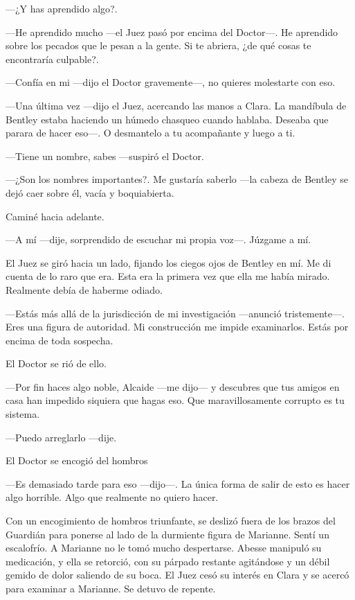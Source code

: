 ---¿Y has aprendido algo?.

---He aprendido mucho ---el Juez pasó por encima del Doctor---. He
aprendido sobre los pecados que le pesan a la gente. Si te abriera, ¿de
qué cosas te encontraría culpable?.

---Confía en mi ---dijo el Doctor gravemente---, no quieres molestarte
con eso.

---Una última vez ---dijo el Juez, acercando las manos a Clara. La
mandíbula de Bentley estaba haciendo un húmedo chasqueo cuando hablaba.
Deseaba que parara de hacer eso---. O desmantelo a tu acompañante y
luego a ti.

---Tiene un nombre, sabes ---suspiró el Doctor.

---¿Son los nombres importantes?. Me gustaría saberlo ---la cabeza de
Bentley se dejó caer sobre él, vacía y boquiabierta.

Caminé hacia adelante.

---A mí ---dije, sorprendido de escuchar mi propia voz---. Júzgame a mí.

El Juez se giró hacia un lado, fijando los ciegos ojos de Bentley en mí.
Me di cuenta de lo raro que era. Esta era la primera vez que ella me
había mirado. Realmente debía de haberme odiado.

---Estás más allá de la jurisdicción de mi investigación ---anunció
tristemente---. Eres una figura de autoridad. Mi construcción me impide
examinarlos. Estás por encima de toda sospecha.

El Doctor se rió de ello.

---Por fin haces algo noble, Alcaide ---me dijo--- y descubres que tus
amigos en casa han impedido siquiera que hagas eso. Que maravillosamente
corrupto es tu sistema.

---Puedo arreglarlo ---dije.

El Doctor se encogió del hombros

---Es demasiado tarde para eso ---dijo---. La única forma de salir de
esto es hacer algo horrible. Algo que realmente no quiero hacer.

Con un encogimiento de hombros triunfante, se deslizó fuera de los
brazos del Guardián para ponerse al lado de la durmiente figura de
Marianne. Sentí un escalofrío. A Marianne no le tomó mucho despertarse.
Abesse manipuló su medicación, y ella se retorció, con su párpado
restante agitándose y un débil gemido de dolor saliendo de su boca. El
Juez cesó su interés en Clara y se acercó para examinar a Marianne. Se
detuvo de repente.

